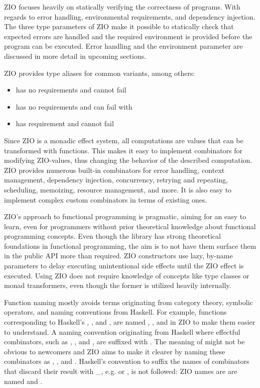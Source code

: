 ZIO focuses heavily on statically verifying the correctness of programs. With regards to error handling, environmental requirements, and dependency injection. The three type parameters of ZIO make it possible to statically check that expected errors are handled and the required environment is provided before the program can be executed. Error handling and the environment parameter are discussed in more detail in upcoming sections.

ZIO provides type aliases for common variants, among others:
\begin{itemize}
    \item {} has no requirements and cannot fail
    \item {} has no requirements and can fail with 
    \item {} has requirement  and cannot fail
\end{itemize}

Since ZIO is a monadic effect system, all computations are values that can be transformed with functions. This makes it easy to implement combinators for modifying ZIO-values, thus changing the behavior of the described computation. ZIO provides numerous built-in combinators for error handling, context management, dependency injection, concurrency, retrying and repeating, scheduling, memoizing, resource management, and more. It is also easy to implement complex custom combinators in terms of existing ones.

ZIO's approach to functional programming is pragmatic, aiming for an easy to learn, even for programmers without prior theoretical knowledge about functional programming concepts. Even though the library has strong theoretical foundations in functional programming, the aim is to not have them surface them in the public API more than required. ZIO constructors use lazy, by-name parameters to delay executing unintentional side effects until the ZIO effect is executed. Using ZIO does not require knowledge of concepts like type classes or monad transformers, even though the former is utilized heavily internally.

Function naming mostly avoids terms originating from category theory, symbolic operators, and naming conventions from Haskell. For example, functions corresponding to Haskell's , , and , are named , , and  in ZIO to make them easier to understand. A naming convention originating from Haskell where effectful combinators, such as , , and , are suffixed with . The meaning of  might not be obvious to newcomers and ZIO aims to make it clearer by naming these combinators as , , and .
Haskell's convention to suffix the names of combinators that discard their result with \_, e.g.  or , is not followed: ZIO names are are named  and .

